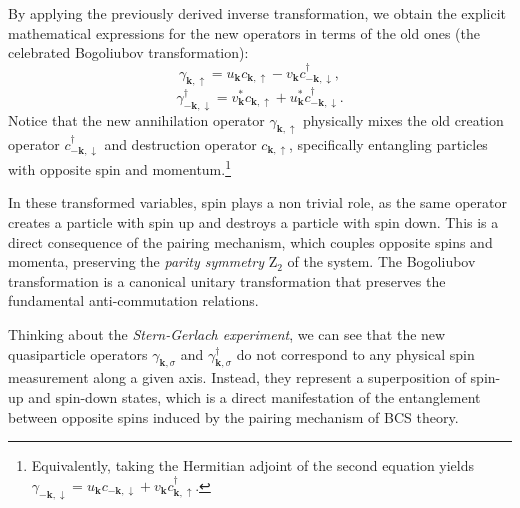 By applying the previously derived inverse transformation, we obtain the explicit mathematical expressions for the new operators in terms of the old ones (the celebrated Bogoliubov transformation):
\begin{equation} \label{eq:bogoliubov_operators}
    \gamma_{\mathbf{k},\uparrow} = u_{\mathbf{k}} c_{\mathbf{k},\uparrow} - v_{\mathbf{k}} c_{-\mathbf{k},\downarrow}^\dagger,
\end{equation}
\[
    \gamma_{-\mathbf{k},\downarrow}^\dagger = v_{\mathbf{k}}^* c_{\mathbf{k},\uparrow} + u_{\mathbf{k}}^* c_{-\mathbf{k},\downarrow}^\dagger.
\]
Notice that the new annihilation operator \( \gamma_{\mathbf{k},\uparrow} \) physically mixes the old creation operator \( c_{-\mathbf{k},\downarrow}^\dagger \) and destruction operator \( c_{\mathbf{k},\uparrow} \), specifically entangling particles with opposite spin and momentum.\footnote{Equivalently, taking the Hermitian adjoint of the second equation yields \( \gamma_{-\mathbf{k},\downarrow} = u_{\mathbf{k}} c_{-\mathbf{k},\downarrow} + v_{\mathbf{k}} c_{\mathbf{k},\uparrow}^\dagger \).}

In these transformed variables, spin plays a non trivial role, as the same operator creates a particle with spin up and destroys a particle with spin down. This is a direct consequence of the pairing mechanism, which couples opposite spins and momenta, preserving the \textit{parity symmetry} \(\mathrm{Z}_2\) of the system. The Bogoliubov transformation is a canonical unitary transformation that preserves the fundamental anti-commutation relations.

Thinking about the \textit{Stern-Gerlach experiment}, we can see that the new quasiparticle operators \( \gamma_{\mathbf{k},\sigma} \) and \( \gamma_{\mathbf{k},\sigma}^\dagger \) do not correspond to any physical spin measurement along a given axis. Instead, they represent a superposition of spin-up and spin-down states, which is a direct manifestation of the entanglement between opposite spins induced by the pairing mechanism of BCS theory.

